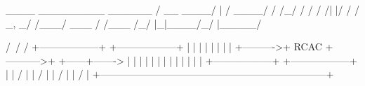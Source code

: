 \begin{DoxyVerb}    ____  _________   ______
   / __ \/ ____/   | / ____/
  / /_/ / /   / /| |/ /     
 / _, _/ /___/ ___ / /___   
/_/ |_|\____/_/  |_\____/   
                            

                          /\
                         /
                        /
            +------------------+            +------------------+
            |                  |            |                  |
            |                  |            |                  |
+---------->+       RCAC       +----------->+                  +------+------->
|           |                  |            |                  |      |
|           |                  |            |                  |      |
|           +------------------+            +------------------+      |
|                /                                                    |
|               /                                                     |
|              /                                                      |
|             /                                                       |
+---------------------------------------------------------------------+
\end{DoxyVerb}
 